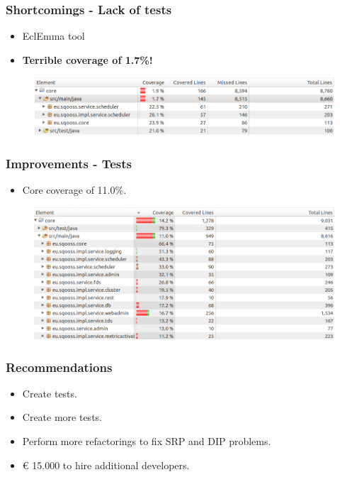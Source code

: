 \documentclass{beamer}
\begin{document}
\begin{frame}
    \frametitle{Shortcomings - Lack of tests}
    \begin{itemize}
        \item EclEmma tool
        \item \textbf{Terrible coverage of 1.7\%!}
        
    \end{itemize}
    \begin{figure}
    	\centering
    		\includegraphics[width=\textwidth]{../img/coreCoverageBefore.png}
    \end{figure}
\end{frame}

\begin{frame}
    \frametitle{Improvements - Tests}
    \begin{itemize}
        \item Core coverage of 11.0\%.
    \end{itemize}
    
    \begin{figure}
    	\centering
    		\includegraphics[width=\textwidth]{../img/coreCoverageAfter.png}
    \end{figure}
\end{frame}

\begin{frame}
    \frametitle{Recommendations}
    \begin{itemize}
    		\item Create tests.
    		\item<2-> Create more tests.
    		\item<3-> Perform more refactorings to fix SRP and DIP problems.
    		\item<4-> $\euro{}$ 15.000 to hire additional developers.
    \end{itemize}
\end{frame}
\end{document}
